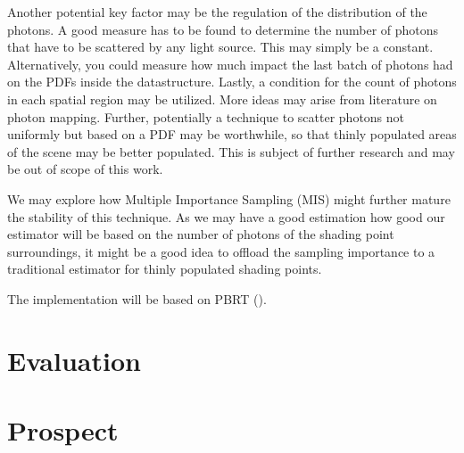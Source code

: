 Another potential key factor may be the regulation of the distribution of the photons. A good measure has to be found to determine the number of photons that have to be scattered by any light source. This may simply be a constant. Alternatively, you could measure how much impact the last batch of photons had on the PDFs inside the datastructure. Lastly, a condition for the count of photons in each spatial region may be utilized. More ideas may arise from literature on photon mapping. Further, potentially a technique to scatter photons not uniformly but based on a PDF may be worthwhile, so that thinly populated areas of the scene may be better populated. This is subject of further research and may be out of scope of this work.

We may explore how Multiple Importance Sampling (MIS) might further mature the stability of this technique. As we may have a good estimation how good our estimator will be based on the number of photons of the shading point surroundings, it might be a good idea to offload the sampling importance to a traditional estimator for thinly populated shading points.

The implementation will be based on PBRT (\cite{pbrt}).


\chapter{Evaluation}
\label{ch:Evaluation}

\chapter{Prospect}
\label{ch:Prospect}
